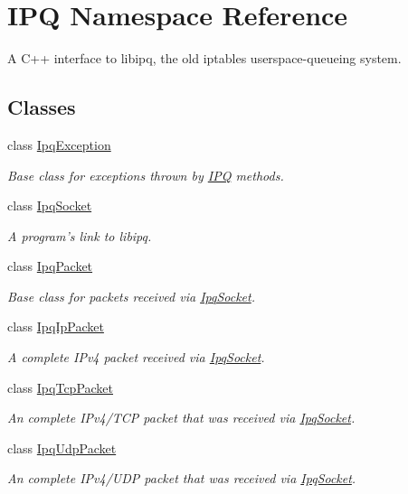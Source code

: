 \hypertarget{namespaceIPQ}{
\section{\-I\-P\-Q \-Namespace \-Reference}
\label{namespaceIPQ}
}


\-A \-C++ interface to libipq, the old iptables userspace-\/queueing system.  


\subsection*{\-Classes}
\begin{DoxyCompactItemize}
\item 
class \hyperlink{classIPQ_1_1IpqException}{\-Ipq\-Exception}
\begin{DoxyCompactList}\small\item\em \-Base class for exceptions thrown by \hyperlink{namespaceIPQ}{\-I\-P\-Q} methods. \end{DoxyCompactList}\item 
class \hyperlink{classIPQ_1_1IpqSocket}{\-Ipq\-Socket}
\begin{DoxyCompactList}\small\item\em \-A program's link to libipq. \end{DoxyCompactList}\item 
class \hyperlink{classIPQ_1_1IpqPacket}{\-Ipq\-Packet}
\begin{DoxyCompactList}\small\item\em \-Base class for packets received via \hyperlink{classIPQ_1_1IpqSocket}{\-Ipq\-Socket}. \end{DoxyCompactList}\item 
class \hyperlink{classIPQ_1_1IpqIpPacket}{\-Ipq\-Ip\-Packet}
\begin{DoxyCompactList}\small\item\em \-A complete \-I\-Pv4 packet received via \hyperlink{classIPQ_1_1IpqSocket}{\-Ipq\-Socket}. \end{DoxyCompactList}\item 
class \hyperlink{classIPQ_1_1IpqTcpPacket}{\-Ipq\-Tcp\-Packet}
\begin{DoxyCompactList}\small\item\em \-An complete \-I\-Pv4/\-T\-C\-P packet that was received via \hyperlink{classIPQ_1_1IpqSocket}{\-Ipq\-Socket}. \end{DoxyCompactList}\item 
class \hyperlink{classIPQ_1_1IpqUdpPacket}{\-Ipq\-Udp\-Packet}
\begin{DoxyCompactList}\small\item\em \-An complete \-I\-Pv4/\-U\-D\-P packet that was received via \hyperlink{classIPQ_1_1IpqSocket}{\-Ipq\-Socket}. \end{DoxyCompactList}\end{DoxyCompactItemize}

